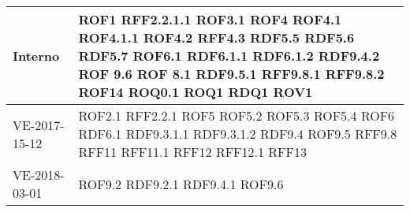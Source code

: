 \documentclass[../AnalisideiRequisiti.tex]{subfiles}
\begin{document}
\begin{longtable}{| p{4cm} | p{4cm} |}
		\newline Interno &  \newline ROF1 \newline RFF2.2.1.1 \newline ROF3.1 \newline ROF4 \newline ROF4.1  \newline ROF4.1.1  \newline ROF4.2  \newline RFF4.3 \newline RDF5.5  \newline RDF5.6  \newline RDF5.7 \newline ROF6.1 \newline RDF6.1.1 \newline RDF6.1.2 \newline RDF9.4.2 \newline ROF 9.6  \newline ROF 8.1  \newline RDF9.5.1  \newline RFF9.8.1  \newline RFF9.8.2 \newline ROF14 \newline ROQ0.1 \newline ROQ1 \newline RDQ1  \newline ROV1 \\[1em]
	\hline
		\newline  VE-2017-15-12 & \newline ROF2.1 \newline RFF2.2.1 \newline ROF5 \newline ROF5.2 \newline ROF5.3 \newline ROF5.4 \newline ROF6 \newline RDF6.1 \newline RDF9.3.1.1 \newline RDF9.3.1.2 \newline RDF9.4 \newline ROF9.5 \newline RFF9.8 \newline RFF11 \newline RFF11.1 \newline RFF12 \newline RFF12.1 \newline RFF13 \\[1em]
	\hline
		\newline VE-2018-03-01 & \newline ROF9.2 \newline RDF9.2.1 \newline RDF9.4.1 \newline ROF9.6 \\[1em]


\end{longtable}
\end{document}
